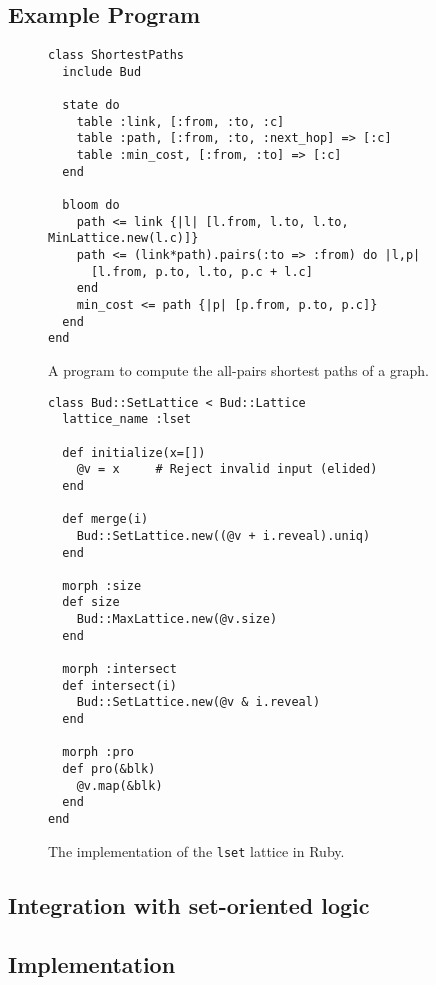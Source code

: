 \subsection{Example Program}
\begin{figure}[t]
\begin{scriptsize}
\begin{lstlisting}
class ShortestPaths
  include Bud

  state do
    table :link, [:from, :to, :c]
    table :path, [:from, :to, :next_hop] => [:c]
    table :min_cost, [:from, :to] => [:c]
  end

  bloom do
    path <= link {|l| [l.from, l.to, l.to, MinLattice.new(l.c)]}
    path <= (link*path).pairs(:to => :from) do |l,p|
      [l.from, p.to, l.to, p.c + l.c]
    end
    min_cost <= path {|p| [p.from, p.to, p.c]}
  end
end
\end{lstlisting}
\end{scriptsize}
\caption{A \lang program to compute the all-pairs shortest paths of a
  graph.}
\label{fig:lattice-spaths}
\end{figure}

\begin{figure}[t]
\begin{scriptsize}
\begin{lstlisting}
class Bud::SetLattice < Bud::Lattice
  lattice_name :lset

  def initialize(x=[])
    @v = x     # Reject invalid input (elided)
  end

  def merge(i)
    Bud::SetLattice.new((@v + i.reveal).uniq)
  end

  morph :size
  def size
    Bud::MaxLattice.new(@v.size)
  end

  morph :intersect
  def intersect(i)
    Bud::SetLattice.new(@v & i.reveal)
  end

  morph :pro
  def pro(&blk)
    @v.map(&blk)
  end
end
\end{lstlisting}
\end{scriptsize}
\caption{The implementation of the \texttt{lset} lattice in Ruby.}
\label{fig:lattice-set}
\end{figure}

\subsection{Integration with set-oriented logic}

\subsection{Implementation}

